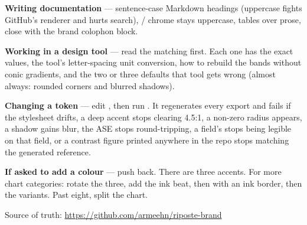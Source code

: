 \documentclass[fontpath=fonts/,logopath=logo/]{riposte-doc}
\begin{document}
\textbf{Writing documentation} — sentence-case Markdown headings (uppercase fights GitHub's renderer and hurts search), / chrome stays uppercase, tables over prose, close with the brand colophon block.

\textbf{Working in a design tool} — read the matching  first. Each one has the exact values, the tool's letter-spacing unit conversion, how to rebuild the bands without conic gradients, and the two or three defaults that tool gets wrong (almost always: rounded corners and blurred shadows).

\textbf{Changing a token} — edit , then run . It regenerates every export and fails if the stylesheet drifts, a deep accent stops clearing 4.5:1, a non-zero radius appears, a shadow gains blur, the ASE stops round-tripping, a field's  stops being legible on that field, or a contrast figure printed anywhere in the repo stops matching the generated reference.

\textbf{If asked to add a colour} — push back. There are three accents. For more chart categories: rotate the three, add the ink beat, then  with an ink border, then the  variants. Past eight, split the chart.

Source of truth: \url{https://github.com/armeehn/riposte-brand}

\ripend
\end{document}
